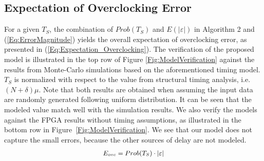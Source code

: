\documentclass{acm_proc_article-sp}
\begin{document}

\subsection{Expectation of Overclocking Error}\label{Sec:MeanError}
For a given $T_S$, the combination of $Prob(T_S)$ and $E(|\varepsilon|)$ in Algorithm 2 and (\ref{Eq:ErrorMagnitude}) yields the overall expectation of overclocking error, as presented in (\ref{Eq:Expectation_Overclocking}). The verification of the proposed model is illustrated in the top row of Figure \ref{Fig:ModelVerification} against the results from Monte-Carlo simulations based on the aforementioned timing model. $T_S$ is normalized with respect to the value from structural timing analysis, i.e. $(N+\delta)\mu$. Note that both results are obtained when assuming the input data are randomly generated following uniform distribution. It can be seen that the modeled value match well with the simulation results. We also verify the models against the FPGA results without timing assumptions, as illustrated in the bottom row in Figure~\ref{Fig:ModelVerification}. We see that our model does not capture the small errors, because the other sources of delay are not modeled.
%
\begin{eqnarray}\label{Eq:Expectation_Overclocking}
\footnotesize
  E_{ovc}=Prob(T_S)\cdot |\varepsilon|
\normalsize
\end{eqnarray}
\end{document}
